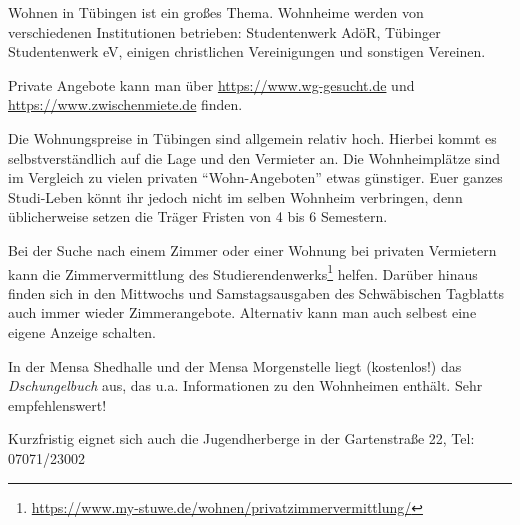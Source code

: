 Wohnen in Tübingen ist ein großes Thema.  Wohnheime werden von verschiedenen Institutionen betrieben: Studentenwerk AdöR, Tübinger Studentenwerk eV, einigen christlichen Vereinigungen und sonstigen Vereinen. 

Private Angebote kann man über \url{https://www.wg-gesucht.de} und \url{https://www.zwischenmiete.de} finden.	%

Die Wohnungspreise in Tübingen sind allgemein relativ hoch. Hierbei kommt es selbstverständlich auf die Lage und den Vermieter an. Die Wohnheimplätze sind im Vergleich zu vielen privaten "`Wohn-Angeboten"' etwas günstiger.  Euer ganzes Studi-Leben könnt ihr jedoch nicht im selben Wohnheim verbringen, denn üblicherweise setzen die Träger Fristen von 4 bis 6 Semestern.

Bei der Suche nach einem Zimmer oder einer Wohnung bei privaten Vermietern kann die Zimmervermittlung des Studierendenwerks\footnote{\url{https://www.my-stuwe.de/wohnen/privatzimmervermittlung/}} helfen. Darüber hinaus finden sich in den Mittwochs und Samstagsausgaben des Schwäbischen Tagblatts auch immer wieder Zimmerangebote. Alternativ kann man auch selbest eine eigene Anzeige schalten.	%

In der Mensa Shedhalle und der Mensa Morgenstelle liegt (kostenlos!) das \emph{Dschungelbuch} aus, das u.a. Informationen zu den Wohnheimen enthält. Sehr empfehlenswert!

Kurzfristig eignet sich auch die Jugendherberge in der Gartenstraße 22, Tel: 07071/23002

